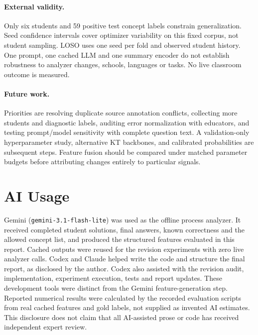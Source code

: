 \documentclass[11pt]{article}
\newcommand{\code}[1]{\texttt{\small #1}}
\begin{document}
\paragraph{External validity.}
Only six students and 59 positive test concept labels constrain generalization. Seed confidence intervals cover optimizer variability on this fixed corpus, not student sampling. LOSO uses one seed per fold and observed student history. One prompt, one cached LLM and one summary encoder do not establish robustness to analyzer changes, schools, languages or tasks. No live classroom outcome is measured.

\paragraph{Future work.}
Priorities are resolving duplicate source annotation conflicts, collecting more students and diagnostic labels, auditing error normalization with educators, and testing prompt/model sensitivity with complete question text. A validation-only hyperparameter study, alternative KT backbones, and calibrated probabilities are subsequent steps. Feature fusion should be compared under matched parameter budgets before attributing changes entirely to particular signals.

\section{AI Usage}
Gemini (\code{gemini-3.1-flash-lite}) was used as the offline process analyzer. It received completed student solutions, final answers, known correctness and the allowed concept list, and produced the structured features evaluated in this report. Cached outputs were reused for the revision experiments with zero live analyzer calls. Codex and Claude helped write the code and structure the final report, as disclosed by the author. Codex also assisted with the revision audit, implementation, experiment execution, tests and report updates. These development tools were distinct from the Gemini feature-generation step. Reported numerical results were calculated by the recorded evaluation scripts from real cached features and gold labels, not supplied as invented AI estimates. This disclosure does not claim that all AI-assisted prose or code has received independent expert review.
\end{document}
